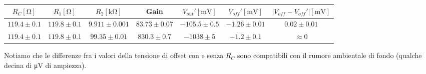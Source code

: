 \begin{center}
\begin{tabular}{c|c|c|c|c|c|c}
$R_C [\si{\ohm}]$& $R_1[\si{\ohm}]$ & $R_2[\si{\kilo\ohm}]$ & Gain & $V_{out}' [\si{\milli\volt}]$ & $V_{off}' [\si{\milli\volt}]$ & $|V_{off}-V_{off}'|[\si{\milli\volt}]$ \\ 
\hline 
$119.4\pm0.1$ & $119.8\pm0.1$ & $9.911\pm0.001$  & $83.73 \pm 0.07$ & $-105.5 \pm 0.5$ & $-1.26 \pm0.01$ & $0.02\pm0.01$ \\
\hline
$119.4\pm0.1$ & $119.8\pm0.1$ & $99.35\pm0.01$  & $830.3\pm0.7$ &$ -1038 \pm 5$ & $-1.2 \pm 0.1$ & $\approx 0$\\
\end{tabular}
\end{center}

Notiamo che le differenze fra i valori della tensione di offset con e senza $R_C$ sono compatibili con il rumore ambientale di fondo (qualche decina di \si{\micro\volt} di ampiezza).


